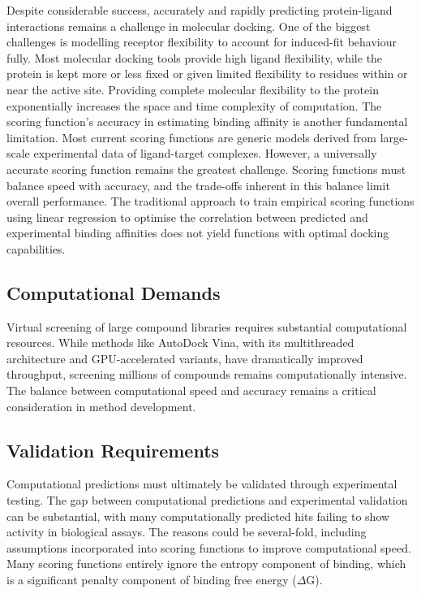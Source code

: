 \documentclass[12pt]{article}
\begin{document}
Despite considerable success, accurately and rapidly predicting protein-ligand interactions remains a challenge in molecular docking. One of the biggest challenges is modelling receptor flexibility to account for induced-fit behaviour fully. Most molecular docking tools provide high ligand flexibility, while the protein is kept more or less fixed or given limited flexibility to residues within or near the active site. Providing complete molecular flexibility to the protein exponentially increases the space and time complexity of computation. The scoring function's accuracy in estimating binding affinity is another fundamental limitation. Most current scoring functions are generic models derived from large-scale experimental data of ligand-target complexes. However, a universally accurate scoring function remains the greatest challenge. Scoring functions must balance speed with accuracy, and the trade-offs inherent in this balance limit overall performance. The traditional approach to train empirical scoring functions using linear regression to optimise the correlation between predicted and experimental binding affinities does not yield functions with optimal docking capabilities\cite{CH1_21}.



\subsection{Computational Demands}

Virtual screening of large compound libraries requires substantial computational resources. While methods like AutoDock Vina, with its multithreaded architecture and GPU-accelerated variants, have dramatically improved throughput, screening millions of compounds remains computationally intensive. The balance between computational speed and accuracy remains a critical consideration in method development\cite{CH1_22, CH1_23}.



\subsection{Validation Requirements}

Computational predictions must ultimately be validated through experimental testing. The gap between computational predictions and experimental validation can be substantial, with many computationally predicted hits failing to show activity in biological assays. The reasons could be several-fold, including assumptions incorporated into scoring functions to improve computational speed. Many scoring functions entirely ignore the entropy component of binding, which is a significant penalty component of binding free energy ($\Delta$G).
\end{document}
